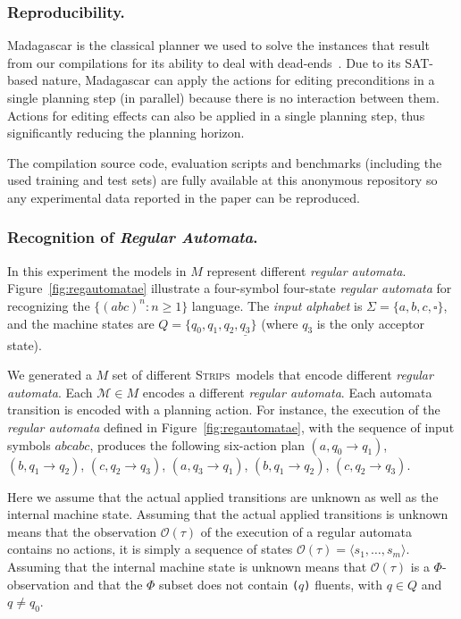 \documentclass[letterpaper]{article} %
\newcommand{\tup}[1]{{\langle #1 \rangle}}
\newcommand{\strips}{\textsc{Strips}}     %
\begin{document}
\subsubsection{Reproducibility.} {\sc Madagascar} is the classical planner we used to solve the instances that result from our compilations for its ability to deal with dead-ends~\cite{rintanen2014madagascar}. Due to its SAT-based nature, {\sc Madagascar} can apply the actions for editing preconditions in a single planning step (in parallel) because there is no interaction between them. Actions for editing effects can also be applied in a single planning step, thus significantly reducing the planning horizon.

The compilation source code, evaluation scripts and benchmarks (including the used training and test sets) are fully available at this anonymous repository {\em } so any experimental data reported in the paper can be reproduced.

\subsubsection{Recognition of {\em Regular Automata}.} In this experiment the models in $M$ represent different {\em regular automata}. Figure~\ref{fig:regautomatae} illustrate a four-symbol four-state {\em regular automata} for recognizing the $\{(abc)^n : n \geq 1 \}$ language. The {\em input alphabet} is $\Sigma=\{a,b,c,\square\}$, and the machine states are $Q=\{q_0,q_1,q_2,\underline{q_3}\}$ (where \underline{$q_3$} is the only acceptor state).

We generated a $M$ set of different \strips\ models that encode different {\em regular automata}. Each $\mathcal{M}\in M$ encodes a different {\em regular automata}. Each automata transition is encoded with a planning action. For instance, the execution of the {\em regular automata} defined in Figure~\ref{fig:regautomatae}, with the sequence of input symbols $abcabc$, produces the following six-action plan {\small $(a,q_0\rightarrow q_1)$, $(b,q_1\rightarrow q_2)$, $(c,q_2\rightarrow q_3)$, $(a,q_3\rightarrow q_1)$, $(b,q_1\rightarrow q_2)$, $(c,q_2\rightarrow q_3)$}.

Here we assume that the actual applied transitions are unknown as well as the internal machine state. Assuming that the actual applied transitions is unknown means that the observation $\mathcal{O}(\tau)$ of the execution of a regular automata contains no actions, it is simply a sequence of states $\mathcal{O}(\tau)=\tup{s_1, \ldots, s_m}$. Assuming that the internal machine state is unknown means that $\mathcal{O}(\tau)$ is a $\Phi$-observation and that the $\Phi$ subset does not contain {\small\tt ($q$)} fluents, with $q\in Q$ and $q\neq q_0$.
\end{document}
